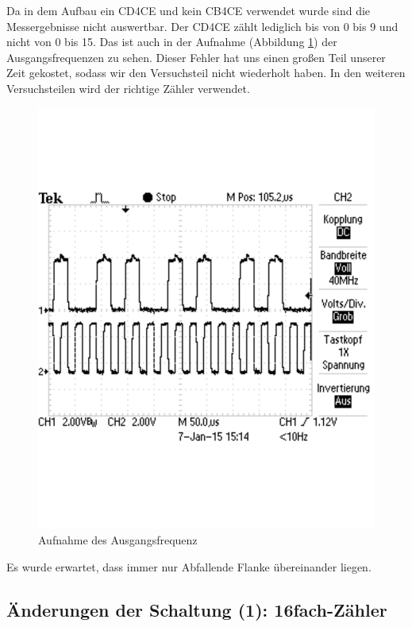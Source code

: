 \documentclass[12pt,a4paper]{article}
\begin{document}
Da in dem Aufbau ein CD4CE und kein CB4CE verwendet wurde sind die Messergebnisse nicht auswertbar. Der CD4CE zählt lediglich bis von 0 bis 9 und nicht von 0 bis 15. Das ist auch in der Aufnahme (Abbildung \ref{fig:frequ_1}) der Ausgangsfrequenzen zu sehen. Dieser Fehler hat uns einen großen Teil unserer Zeit gekostet, sodass wir den Versuchsteil nicht wiederholt haben. In den weiteren Versuchsteilen wird der richtige Zähler verwendet.

\begin{figure}[H] 
  \centering 	
    \includegraphics[trim = 0mm 50mm 0mm 50mm, clip, scale = 0.4]{TEK0011.pdf}
  	\caption[Aufnahme des Ausgangsfrequenz]{Aufnahme des Ausgangsfrequenz}
  \label{fig:frequ_1}
\end{figure}

Es wurde erwartet, dass immer nur Abfallende Flanke übereinander liegen.

\subsection{Änderungen der Schaltung (1): 16fach-Zähler}
\end{document}
